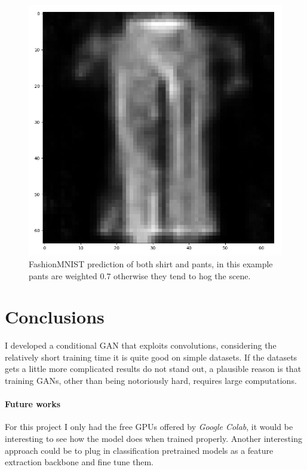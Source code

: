 \documentclass[10pt,twocolumn,letterpaper]{article}
\begin{document}
\begin{figure}[h!t]
   \centering
   \includegraphics[scale=0.39]{images/shirtpants-weighted.png}
   \caption{FashionMNIST prediction of both shirt and pants, in this example pants are weighted $0.7$ otherwise they tend to hog the scene.}
   \label{fig:fashion-shirt-pants}
\end{figure}

\section{Conclusions}
I developed a conditional GAN that exploits convolutions, considering the relatively short training time it is quite good on simple datasets.
If the datasets gets a little more complicated results do not stand out, a plausible reason is that training GANs, other than being notoriously hard, requires large computations.

\paragraph{Future works} For this project I only had the free GPUs offered by \textit{Google Colab}, it would be interesting to see how the model does when trained properly.
Another interesting approach could be to plug in classification pretrained models as a feature extraction backbone and fine tune them.


   {\small
      
      
   }
\end{document}
